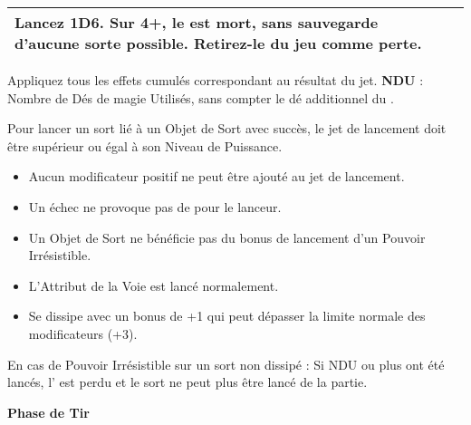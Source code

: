 {\begin{multicols}{2}
\begin{center}
\begin{tabular}{>{\raggedleft}p{1.8cm}p{5.8cm}}
\vspace*{3pt}
Lancez 1D6. Sur 4+, le \wizard{} est mort, sans sauvegarde d'aucune sorte possible. Retirez-le du jeu comme perte.\tabularnewline
\hline
\end{tabular}
\end{center}
\renewcommand{\arraystretch}{1.5}

\vspace*{5pt}
\noindent Appliquez tous les effets cumulés correspondant au résultat du jet.\newline
\textbf{NDU} : Nombre de Dés de magie Utilisés, sans compter le dé additionnel du \overwhelmingpower{}.

\vspace*{10pt}

\begin{framed}
\vspace*{-25pt}

Pour lancer un sort lié à un Objet de Sort avec succès, le jet de lancement doit être supérieur ou égal à son Niveau de Puissance.
\begin{itemize}[label={-}]
\item Aucun modificateur positif ne peut être ajouté au jet de lancement.
\item Un échec ne provoque pas de  pour le lanceur.
\item Un Objet de Sort ne bénéficie pas du bonus de lancement d'un Pouvoir Irrésistible.
\item L'Attribut de la Voie est lancé normalement.
\item Se dissipe avec un bonus de +1 qui peut dépasser la limite normale des modificateurs (+3).
\end{itemize}

En cas de Pouvoir Irrésistible sur un sort non dissipé :\newline
Si NDU ou plus ont été lancés, l'\boundspell{} est perdu et le sort ne peut plus être lancé de la partie.
\end{framed}

\vspace*{\fill}
\end{multicols}

\newpage

\begin{center}\Largerfontsize\textbf{Phase de Tir}\end{center}

}
